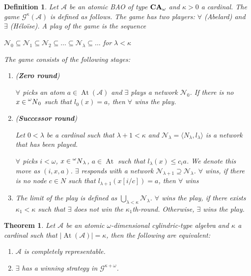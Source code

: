\documentclass[a4paper]{article}
\theoremstyle{defin}
\newtheorem{defin}{Definition}
\theoremstyle{theorem}
\newtheorem{theorem}{Theorem}
\theoremstyle{prop}
\theoremstyle{lemma}
\theoremstyle{fact}
\theoremstyle{ex}
\theoremstyle{col}
\begin{document}
\begin{defin}
  Let $\mathcal{A}$ be an atomic BAO of type ${\bf CA}_{\omega}$ and $\kappa > 0$ a cardinal. The game $\mathcal{G}^{\kappa}(\mathcal{A})$ is defined as follows. The game has two players: $\forall$ (Abelard) and $\exists$ (H\'{e}lo\"{i}se). A play of the game is the sequence
  \begin{center}
    $\mathcal{N}_0 \subseteq \mathcal{N}_1 \subseteq \mathcal{N}_2 \subseteq \dots \subseteq \mathcal{N}_{\lambda} \subseteq \dots$ for $\lambda < \kappa$
  \end{center}
  The game consists of the following stages:
  \begin{enumerate}
    \item ({\bf Zero round})

    $\forall$ picks an atom $a \in \operatorname{At}(\mathcal{A})$ and $\exists$ plays a network $\mathcal{N}_0$. If there is no $x \in \prescript{\omega}{}N_0$ such that $l_0(x) = a$, then $\forall$ wins the play.
    \item ({\bf Successor round})

    Let $0 < \lambda$ be a cardinal such that $\lambda + 1 < \kappa$ and $\mathcal{N}_{\lambda} = \langle N_{\lambda}, l_{\lambda} \rangle$ is a network that has been played.

    $\forall$ picks $i < \omega$, $x \in \prescript{\omega}{}N_{\lambda}$, $a \in \operatorname{At}$ such that $l_{\lambda}(x) \leq c_i a$.
    We denote this move as $(i, x, a)$. $\exists$ responds with a network $\mathcal{N}_{\lambda + 1} \supseteq \mathcal{N}_{\lambda}$. $\forall$ wins, if there is no node $c \in N$ such that $l_{\lambda+1}(x[i/c]) = a$, then $\forall$ wins
    \item The limit of the play is defined as $\bigcup \limits_{\lambda < \kappa} \mathcal{N}_{\lambda}$. $\forall$ wins the play, if there exists $\kappa_1 < \kappa$ such that $\exists$ does not win the $\kappa_1$th-round. Otherwise, $\exists$ wins the play.
  \end{enumerate}
\end{defin}

\begin{theorem}
  Let $\mathcal{A}$ be an atomic $\omega$-dimensional cylindric-type algebra and $\kappa$ a cardinal such that $|\operatorname{At}(\mathcal{A})| = \kappa$, then the following are equivalent:

  \begin{enumerate}
    \item $\mathcal{A}$ is completely representable.
    \item $\exists$ has a winning strategy in $\mathcal{G}^{\kappa + \omega}$.
  \end{enumerate}
\end{theorem}
\end{document}
